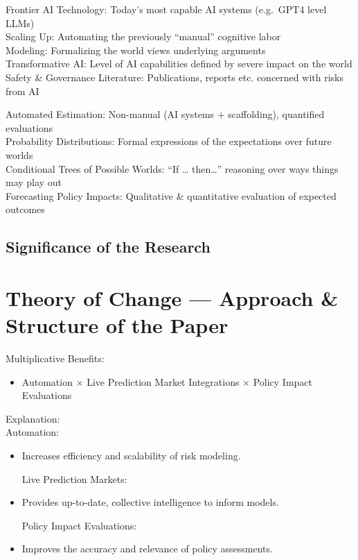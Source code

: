 \documentclass[
  letterpaper,
]{book}
\providecommand{\tightlist}{%
  \setlength{\itemsep}{0pt}\setlength{\parskip}{0pt}}
\begin{document}
Frontier AI Technology: Today's most capable AI systems (e.g.~GPT4 level
LLMs)\\
Scaling Up: Automating the previously ``manual'' cognitive labor\\
Modeling: Formalizing the world views underlying arguments\\
Transformative AI: Level of AI capabilities defined by severe impact on
the world\\
Safety \& Governance Literature: Publications, reports etc. concerned
with risks from AI

Automated Estimation: Non-manual (AI systems + scaffolding), quantified
evaluations\\
Probability Distributions: Formal expressions of the expectations over
future worlds\\
Conditional Trees of Possible Worlds: ``If \ldots{} then\ldots{}''
reasoning over ways things may play out\\
Forecasting Policy Impacts: Qualitative \& quantitative evaluation of
expected outcomes

\subsection{Significance of the
Research}\label{significance-of-the-research}

\subsection{}\label{section}

\section{Theory of Change --- Approach \& Structure of the
Paper}\label{theory-of-change-approach-structure-of-the-paper}

Multiplicative Benefits:

\begin{itemize}
\tightlist
\item
  Automation × Live Prediction Market Integrations × Policy Impact
  Evaluations
\end{itemize}

Explanation:\\
Automation:

\begin{itemize}
\item
  Increases efficiency and scalability of risk modeling.

  Live Prediction Markets:
\item
  Provides up-to-date, collective intelligence to inform models.

  Policy Impact Evaluations:
\item
  Improves the accuracy and relevance of policy assessments.
\end{itemize}
\end{document}
